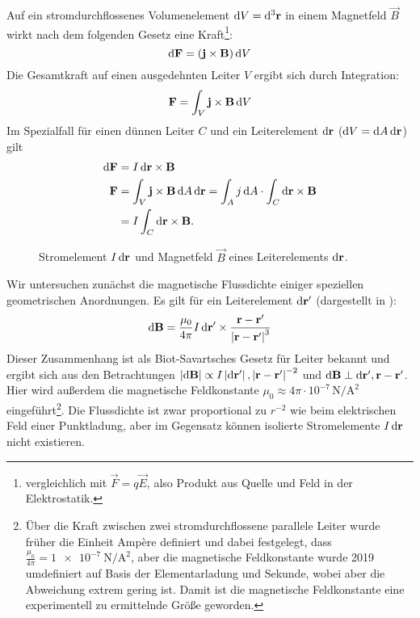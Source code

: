Auf ein stromdurchflossenes Volumenelement $\mathop{}\!\mathrm{d} V=\mathop{}\!\mathrm{d}^3 \mathbf{r}$ in einem Magnetfeld $\vec B$ wirkt nach dem folgenden Gesetz eine Kraft\footnote{vergleichlich mit $\vec {F}=q\vec {E}$, also Produkt aus Quelle und Feld in der Elektrostatik. }:
\begin{equation*}
	\mathop{}\!\mathrm{d} \mathbf{F}=(\mathbf{j}\times\mathbf{B})\mathop{}\!\mathrm{d} V
\end{equation*}
Die Gesamtkraft auf einen ausgedehnten Leiter $V$ ergibt sich durch Integration:
\begin{equation*}
	\mathbf{F}=\int _{V}\mathbf{j}\times \mathbf{B}\mathop{}\!\mathrm{d} V
\end{equation*}
Im Spezialfall für einen dünnen Leiter $C$ und ein Leiterelement $\mathop{}\!\mathrm{d}\mathbf{r}$ ($\mathop{}\!\mathrm{d} V = \mathop{}\!\mathrm{d} A\mathop{}\!\mathrm{d}\mathbf{r}$) gilt
\begin{align}
	\label{eq:def_magn_flussdichte}
	\mathop{}\!\mathrm{d} \mathbf{F} & =I\mathop{}\!\mathrm{d}\mathbf{r}\times\mathbf{B}                                                                                               \\
	\mathbf{F}     & =\int _{V}\mathbf{j}\times \mathbf{B}\mathop{}\!\mathrm{d} A \mathop{}\!\mathrm{d}\mathbf{r} = \int_{A}j\mathop{}\!\mathrm{d} A \cdot \int_C \mathop{}\!\mathrm{d}\mathbf{r}\times \mathbf{B} \nonumber \\& = I\int_C \mathop{}\!\mathrm{d}\mathbf{r}\times \mathbf{B} .\nonumber
\end{align}

\begin{figure}[htb]
	\centering
	\tfigMagnetfeldBeiLeiter
	\caption{Stromelement $I\mathop{}\!\mathrm{d}\mathbf{r}$ und Magnetfeld $\vec B$ eines Leiterelements $\mathop{}\!\mathrm{d} \mathbf{r}$. }
	\label{fig:magnetic_field_conductor_diff_view}
\end{figure}
Wir untersuchen zunächst die magnetische Flussdichte einiger speziellen geometrischen Anordnungen. Es gilt für ein Leiterelement $\mathop{}\!\mathrm{d} \mathbf{r}'$ (dargestellt in ):
\begin{equation}
	\label{eq:biot_savart_leiter_differentiell}
	\mathop{}\!\mathrm{d} \mathbf{B}=\frac{\mu _{0}}{4\pi }I\mathop{}\!\mathrm{d} \mathbf{r}'\times \frac{\mathbf{r}-\mathbf{r}'}{\left| \mathbf{r}-\mathbf{r}'\right| ^{3}}
\end{equation}
Dieser Zusammenhang ist als Biot-Savartsches Gesetz für Leiter bekannt und ergibt sich aus den Betrachtungen $\left| \mathop{}\!\mathrm{d} \mathbf{B}\right| \propto I\left| \mathop{}\!\mathrm{d} \mathbf{r}'\right| , \left| \mathbf{r}-\mathbf{r}'\right| ^{-2}$ und $\mathop{}\!\mathrm{d} \mathbf{B}\perp \mathop{}\!\mathrm{d} \mathbf{r}',\mathbf{r}-\mathbf{r}'$. Hier wird außerdem die magnetische Feldkonstante $\mu _{0}\approx 4\pi \cdot 10^{-7}\,\si{\newton\per\square\ampere}$ eingeführt\footnote{Über die Kraft zwischen zwei stromdurchflossene parallele Leiter wurde früher die Einheit Ampère definiert und dabei festgelegt, dass $\frac{\mu _{0}}{4\pi }=\SI{1e-7}{\newton\per\square\ampere}$, aber die magnetische Feldkonstante wurde 2019 umdefiniert auf Basis der Elementarladung und Sekunde, wobei aber die Abweichung extrem gering ist. Damit ist die magnetische Feldkonstante eine experimentell zu ermittelnde Größe geworden. }. Die Flussdichte ist zwar proportional zu $r^{-2}$ wie beim elektrischen Feld einer Punktladung, aber im Gegensatz können isolierte Stromelemente $I\mathop{}\!\mathrm{d} \mathbf{r}$ nicht existieren.

